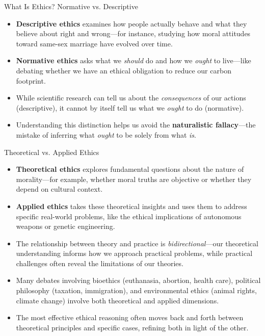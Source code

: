 \documentclass[aspectratio=169]{beamer}
\begin{document}
\begin{frame}{What Is Ethics? Normative vs. Descriptive}
\begin{itemize}
\item \textbf{Descriptive ethics} examines how people actually behave and what they believe about right and wrong—for instance, studying how moral attitudes toward same-sex marriage have evolved over time.
\item \textbf{Normative ethics} asks what we \emph{should} do and how we \emph{ought} to live—like debating whether we have an ethical obligation to reduce our carbon footprint.
\item While scientific research can tell us about the \emph{consequences} of our actions (descriptive), it cannot by itself tell us what we \emph{ought} to do (normative).
\item Understanding this distinction helps us avoid the \textbf{naturalistic fallacy}—the mistake of inferring what \emph{ought} to be solely from what \emph{is}.
\end{itemize}
\end{frame}

\begin{frame}{Theoretical vs. Applied Ethics}
\begin{itemize}
\item \textbf{Theoretical ethics} explores fundamental questions about the nature of morality—for example, whether moral truths are objective or whether they depend on cultural context.
\item \textbf{Applied ethics} takes these theoretical insights and uses them to address specific real-world problems, like the ethical implications of autonomous weapons or genetic engineering.
\item The relationship between theory and practice is \emph{bidirectional}—our theoretical understanding informs how we approach practical problems, while practical challenges often reveal the limitations of our theories.
\item Many debates involving bioethics (euthanasia, abortion, health care), political philosophy (taxation, immigration), and environmental ethics (animal rights, climate change) involve both theoretical and applied dimensions.
\item The most effective ethical reasoning often moves back and forth between theoretical principles and specific cases, refining both in light of the other.
\end{itemize}
\end{frame}
\end{document}
